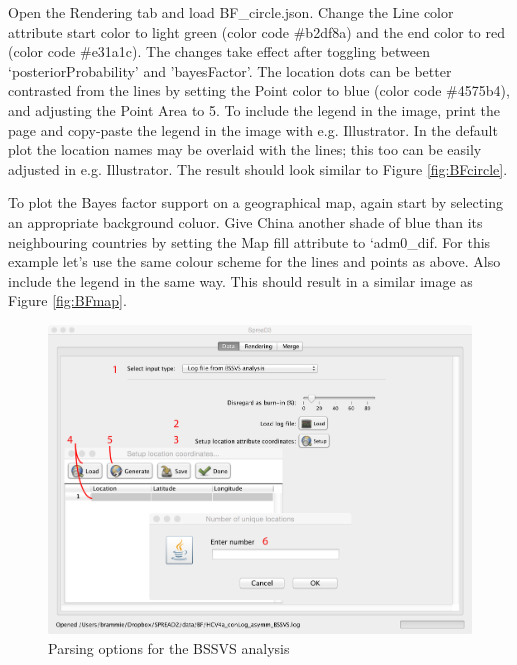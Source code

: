 \documentclass[english]{paper}
\begin{document}
Open the Rendering tab and load BF\_circle.json.
Change the Line color attribute start color to light green (color code \#b2df8a) and the end color to red (color code \#e31a1c).
The changes take effect after toggling between `posteriorProbability' and 'bayesFactor'.
The location dots can be better contrasted from the lines by setting the Point color to blue (color code \#4575b4), and adjusting the Point Area to 5. 
To include the legend in the image, print the page and copy-paste the legend in the image with e.g. Illustrator. 
In the default plot the location names may be overlaid with the lines; this too can be easily adjusted in e.g. Illustrator.
The result should look similar to Figure \ref{fig:BFcircle}.
\par
To plot the Bayes factor support on a geographical map, again start by selecting an appropriate background coluor.
Give China another shade of blue than its neighbouring countries by setting the Map fill attribute to `adm0\_dif.
For this example let's use the same colour scheme for the lines and points as above. 
Also include the legend in the same way. 
This should result in a similar image as Figure \ref{fig:BFmap}.

\begin{figure}[!H]
\centering
\includegraphics[width=1\textwidth]{./figures/Fig5_BFparse.pdf} %
\caption{Parsing options for the BSSVS analysis}
\label{fig:parseBF}
\end{figure}
\end{document}
